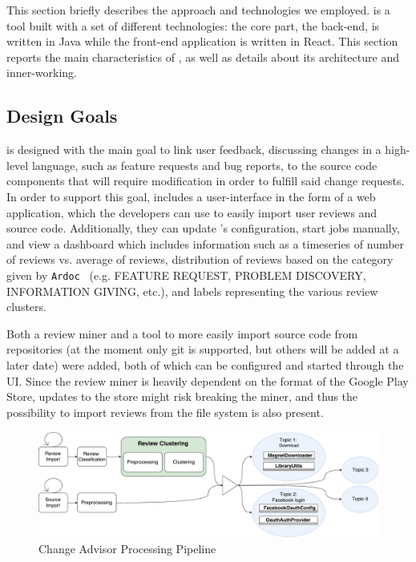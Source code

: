 This section briefly describes the approach and technologies we employed. 
\tool{} is a tool built with a set of different technologies: the core part, the back-end, is written in Java while the front-end application is written in React.
This section reports the main characteristics of \tool{}, as well as details about its architecture and inner-working.
%
%
\subsection{Design Goals}
\tool{} is designed with the main goal to link user feedback, discussing changes in a high-level language, such as feature requests and bug reports, to the source code components that will require modification in order to fulfill said change requests.
In order to support this goal, \tool{} includes a user-interface in the form of a web application, which the developers can use to easily import user reviews and source code. Additionally, they can update \tool{}'s configuration, start jobs manually, and view a dashboard which includes information such as a timeseries of number of reviews vs. average of reviews, distribution of reviews based on the category given by \texttt{Ardoc}~\cite{panichella2016ardoc} (e.g. FEATURE REQUEST, PROBLEM DISCOVERY, INFORMATION GIVING, etc.), and labels representing the various review clusters.

Both a review miner and a tool to more easily import source code from repositories (at the moment only git is supported, but others will be added at a later date) were added, both of which can be configured and started through the UI.
Since the review miner is heavily dependent on the format of the Google Play Store, updates to the store might risk breaking the miner, and thus the possibility to import reviews from the file system is also present.

%
%
\begin{figure}[!h]
    \centering
    \includegraphics[scale=0.3]{imgs/ChangeAdvisorPipeline.pdf}
    \caption{Change Advisor Processing Pipeline}
    	\label{fig:architecture}
\end{figure}

